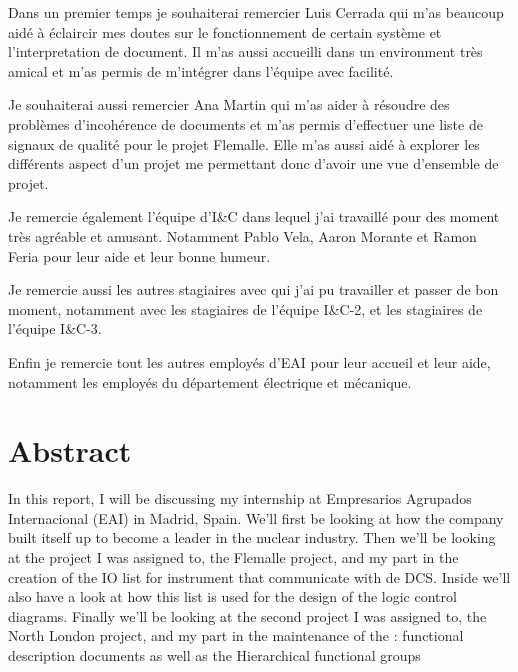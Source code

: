 \documentclass[11pt, openright]{book}
\begin{document}









\newpage
\thispagestyle{plain}

\vspace{7cm}
\fontsize{12}{13}
Dans un premier temps je souhaiterai remercier Luis Cerrada qui m'as beaucoup aidé à éclaircir mes doutes sur le fonctionnement de certain système et l'interpretation de document. Il m'as aussi accueilli dans un environment très amical et m'as permis de m'intégrer dans l'équipe avec facilité.

Je souhaiterai aussi remercier Ana Martin qui m'as aider à résoudre des problèmes d'inco\-hérence de documents et m'as permis d'effectuer une liste de signaux de qualité pour le projet Flemalle. Elle m'as aussi aidé à explorer les différents aspect d'un projet me permettant donc d'avoir une vue d'ensemble de projet.

Je remercie également l'équipe d'I\&C dans lequel j'ai travaillé pour des moment très agréable et amusant. Notamment Pablo Vela, Aaron Morante et Ramon Feria pour leur aide et leur bonne humeur.

Je remercie aussi les autres stagiaires avec qui j'ai pu travailler et passer de bon moment, notamment avec les stagiaires de l'équipe I\&C-2, et les stagiaires de l'équipe I\&C-3.

Enfin je remercie tout les autres employés d'EAI pour leur accueil et leur aide, notamment les employés du département électrique et mécanique.




\newpage
\thispagestyle{plain}
\vspace*{\fill}
\section*{Abstract}
In this report, I will be discussing my internship at Empresarios Agrupados Internacional (EAI) in Madrid, Spain. We'll first be looking at how the company built itself up to become a leader in the nuclear industry. Then we'll be looking at the project I was assigned to, the Flemalle project, and my part in the creation of the IO list for instrument that communicate with de DCS. Inside we'll also have a look at how this list is used for the design of the logic control diagrams. Finally we'll be looking at the second project I was assigned to, the North London project, and my part in the maintenance of the : functional description documents as well as the Hierarchical functional groups
\vspace*{\fill}
\end{document}
